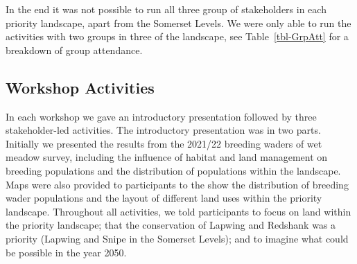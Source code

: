 \documentclass[
  12pt,
  letterpaper,
  DIV=11,
  numbers=noendperiod]{scrartcl}
\begin{document}
In the end it was not possible to run all three group of stakeholders in
each priority landscape, apart from the Somerset Levels. We were only
able to run the activities with two groups in three of the landscape,
see Table~\ref{tbl-GrpAtt} for a breakdown of group attendance.

\begin{table}

\caption{\label{tbl-GrpAtt}Workshop attendance for the three different
stakeholder groups across the four priority landscapes. Note if only one
member of a stakeholder group attended a workshop then this individual
was gnerally moved into one of the other groups. Number of attendees for
each group is shown in brackets.}


\end{table}%

\subsection{Workshop Activities}\label{workshop-activities}

In each workshop we gave an introductory presentation followed by three
stakeholder-led activities. The introductory presentation was in two
parts. Initially we presented the results from the 2021/22 breeding
waders of wet meadow survey, including the influence of habitat and land
management on breeding populations and the distribution of populations
within the landscape. Maps were also provided to participants to the
show the distribution of breeding wader populations and the layout of
different land uses within the priority landscape. Throughout all
activities, we told participants to focus on land within the priority
landscape; that the conservation of Lapwing and Redshank was a priority
(Lapwing and Snipe in the Somerset Levels); and to imagine what could be
possible in the year 2050.
\end{document}
